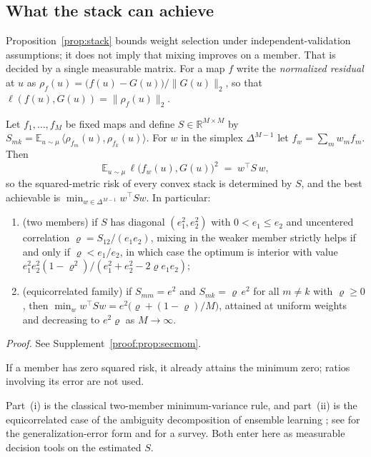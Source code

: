\subsection{What the stack can achieve}
\label{sec:theory-secmom}

Proposition~\ref{prop:stack} bounds weight selection under independent-validation assumptions; it does not imply that mixing improves on a member. That is decided by a single measurable matrix. For a
map $f$ write the \emph{normalized residual} at $u$ as
$\rho_f(u)=\big(f(u)-G(u)\big)/\|G(u)\|_2$, so that
$\ell(f(u),G(u))=\|\rho_f(u)\|_2$.

\begin{proposition}\label{prop:secmom}
Let $f_1,\dots,f_M$ be fixed maps and define
$S\in\mathbb R^{M\times M}$ by
$S_{mk}=\mathbb E_{u\sim\mu}\,\langle\rho_{f_m}(u),\rho_{f_k}(u)\rangle$.
For $w$ in the simplex $\Delta^{M-1}$ let $f_w=\sum_m w_mf_m$. Then
\[
\mathbb E_{u\sim\mu}\,\ell\big(f_w(u),G(u)\big)^2\;=\;w^\top S\,w ,
\]
so the squared-metric risk of every convex stack is determined by $S$, and
the best achievable is $\min_{w\in\Delta^{M-1}}w^\top Sw$. In particular:
\begin{enumerate}
\item[(i)] (two members) if $S$ has diagonal $(e_1^2,e_2^2)$ with $0<e_1\le e_2$
and uncentered correlation $\varrho=S_{12}/(e_1e_2)$, mixing in the weaker member
strictly helps if and only if $\varrho<e_1/e_2$, in which case the optimum is
interior with value $e_1^2e_2^2(1-\varrho^2)/(e_1^2+e_2^2-2\varrho e_1e_2)$;
\item[(ii)] (equicorrelated family) if $S_{mm}=e^2$ and $S_{mk}=\varrho\,e^2$
for all $m\neq k$ with $\varrho\ge0$, then
$\min_{w}w^\top Sw=e^2\big(\varrho+(1-\varrho)/M\big)$, attained at uniform
weights and decreasing to $e^2\varrho$ as $M\to\infty$.
\end{enumerate}
\end{proposition}
\noindent\emph{Proof.} See Supplement~\ref{proof:prop:secmom}.


If a member has zero squared risk, it already attains the minimum zero; ratios involving its error are not used.

Part~(i) is the classical two-member minimum-variance rule, and part~(ii) is
the equicorrelated case of the ambiguity decomposition of ensemble learning
\citep{krogh1995neural}; see \citet{ueda1996generalization} for the
generalization-error form and \citet{brown2005diversity} for a survey. Both
enter here as measurable decision tools on the estimated $S$.

